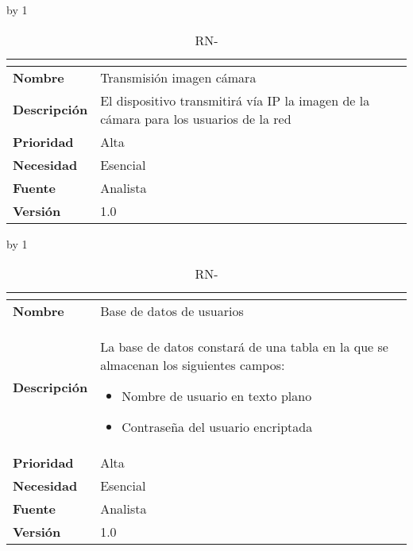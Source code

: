 \advance\rn by 1
\begin{table}[H]
	\caption{RN-\number\rn}
	\begin{tabular}{|l|p{}|}
		\hline
		\multicolumn{2}{|c|}{\cellcolor[HTML]{BFBFBF}{\color[HTML]{000000} \textbf{RN-\number\rn}}} \\ \hline
		\textbf{Nombre}      & Transmisión imagen cámara                                                            \\ \hline
		\textbf{Descripción} & El dispositivo transmitirá vía IP la imagen de la cámara para los usuarios de la red \\ \hline
		\textbf{Prioridad}   & Alta                                                                                 \\ \hline
		\textbf{Necesidad}   & Esencial                                                                             \\ \hline
		\textbf{Fuente}      & Analista                                                                             \\ \hline
		\textbf{Versión}     & 1.0                                                                                  \\ \hline
	\end{tabular}
\end{table}
\advance\rn by 1
\begin{table}[H]
	\caption{RN-\number\rn}
	\begin{tabular}{|l|p{}|}
		\hline
		\multicolumn{2}{|c|}{\cellcolor[HTML]{BFBFBF}{\color[HTML]{000000} \textbf{RN-\number\rn}}} \\ \hline
		\textbf{Nombre}      & Base de datos de usuarios                                                            \\ \hline
		\textbf{Descripción} & La base de datos constará de una tabla en la que se almacenan los siguientes campos:
		\begin{itemize}
			\item Nombre de usuario en texto plano
			\item Contraseña del usuario encriptada
		\end{itemize}  \\ \hline
		\textbf{Prioridad}   & Alta                                                                                 \\ \hline
		\textbf{Necesidad}   & Esencial                                                                             \\ \hline
		\textbf{Fuente}      & Analista                                                                             \\ \hline
		\textbf{Versión}     & 1.0                                                                                  \\ \hline
	\end{tabular}
\end{table}
